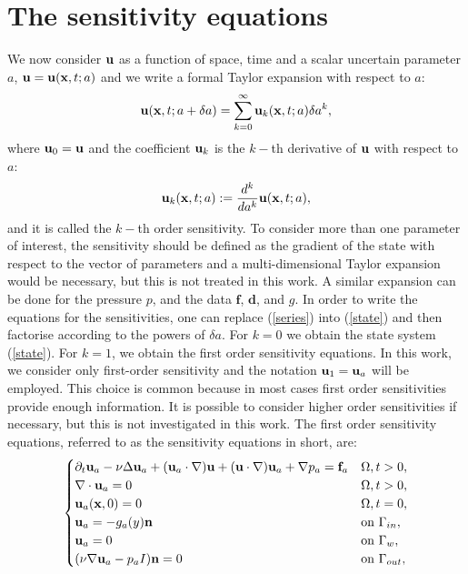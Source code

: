 \section{The sensitivity equations}
We now consider $\b_u$ as a function of space, time and a scalar uncertain parameter $a$, $\b_u = \b_u(\mathbf{x},t;a)$ and we write a formal Taylor expansion with respect to $a$:
\begin{equation}
\b_u(\mathbf{x},t;a+\delta a) = \displaystyle \sum_{k=0}^\infty \b_u_k(\mathbf{x},t;a) \delta a^k,
\label{series}
\end{equation}
where $\b_u_0 = \b_u$ and the coefficient $\b_u_k$ is the $k-$th derivative of $\b_u$ with respect to $a$:
\[
\b_u_k(\mathbf{x},t;a) := \frac{d^k}{da^k} \b_u(\mathbf{x},t;a),
\]
and it is called the $k-$th order sensitivity. To consider more than one parameter of interest, the sensitivity should be defined as the gradient of the state with respect to the vector of parameters and a multi-dimensional Taylor expansion would be necessary, but this is not treated in this work. A similar expansion can be done for the pressure $p$, and the data $\mathbf{f}$, $\mathbf{d}$, and $g$. In order to write the equations for the sensitivities, one can replace (\ref{series}) into (\ref{state}) and then factorise according to the powers of $\delta a$. For $k=0$ we obtain the state system (\ref{state}). For $k=1$, we obtain the first order sensitivity equations. In this work, we consider only first-order sensitivity and the notation $\b_u_1 = \b_u_a$ will be employed. This choice is common \cite{Borggaard1997366, duvigneau2006improved, Duvigneau_Pelletier_06_ijcfd, chalons2018sensitivity, SA_Euler} because in most cases first order sensitivities provide enough information. It is possible to consider higher order sensitivities if necessary, but this is not investigated in this work. The first order sensitivity equations, referred to as the sensitivity equations in short, are:
\begin{equation}
\begin{cases}
\partial_t \b_u_a - \nu \Delta \b_u_a + (\b_u_a \cdot \nabla) \b_u + (\b_u \cdot \nabla) \b_u_a + \nabla p_a = \mathbf{f}_a& \Omega, t > 0, \\
\nabla \cdot \b_u_a = 0 & \Omega, t>0, \\
\b_u_a (\mathbf{x}, 0) = 0 & \Omega, t=0, \\
\b_u_a = - g_a(y)\mathbf{n} & \text{on } \Gamma_{in}, \\
\b_u_a = 0 & \text{on } \Gamma_w , \\
(\nu \nabla \b_u_a -p_aI) \mathbf{n} = 0 & \text{on } \Gamma_{out},
\end{cases}
\label{sensitivity}
\end{equation}

